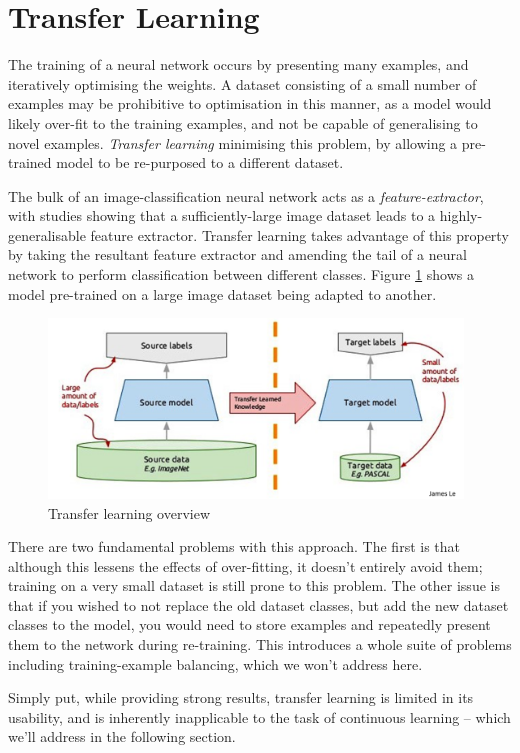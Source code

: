 \documentclass{report}
\begin{document}
	\section{Transfer Learning}
	The training of a neural network occurs by presenting many examples, and iteratively optimising the weights. A dataset consisting of a small number of examples may be prohibitive to optimisation in this manner, as a model would likely over-fit to the training examples, and not be capable of generalising to novel examples. \emph{Transfer learning} minimising this problem, by allowing a pre-trained model to be re-purposed to a different dataset. \par
	The bulk of an image-classification neural network acts as a \emph{feature-extractor}, with studies\parencite{extractors} showing that a sufficiently-large image dataset leads to a highly-generalisable feature extractor. Transfer learning takes advantage of this property by taking the resultant feature extractor and amending the tail of a neural network to perform classification between different classes. Figure \ref{fig:transferlearning:1} shows a model pre-trained on a large image dataset being adapted to another. \par
	\begin{figure}[h]
		\centering
		\includegraphics[width=11cm]{transferlearning}
		\caption{Transfer learning overview}
		\label{fig:transferlearning:1}
	\end{figure}
	There are two fundamental problems with this approach. The first is that although this lessens the effects of over-fitting, it doesn't entirely avoid them; training on a very small dataset is still prone to this problem. The other issue is that if you wished to not replace the old dataset classes, but add the new dataset classes to the model, you would need to store examples and repeatedly present them to the network during re-training. This introduces a whole suite of problems including training-example balancing, which we won't address here. \par
	Simply put, while providing strong results, transfer learning is limited in its usability, and is inherently inapplicable to the task of continuous learning -- which we'll address in the following section. \par
	
\end{document}
